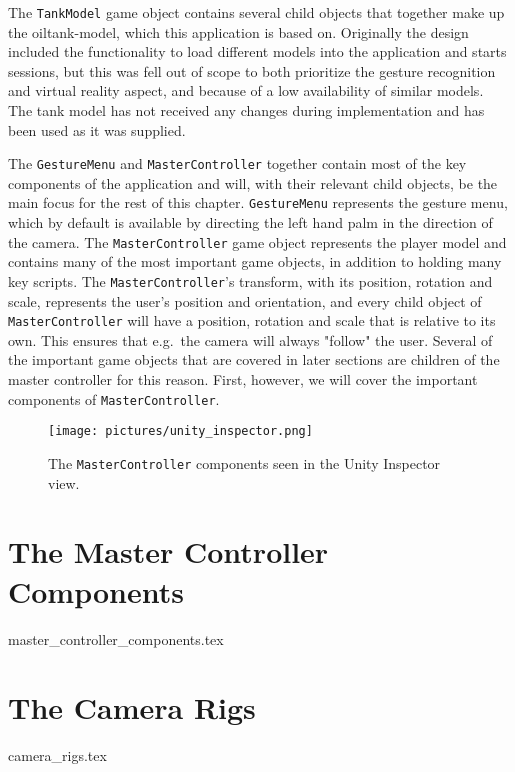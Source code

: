 The \texttt{TankModel} game object contains several child objects that together make up the oiltank-model, which this application is based on.
Originally the design included the functionality to load different models into the application and starts sessions, but 
this was fell out of scope to both prioritize the gesture recognition and virtual reality aspect, and because of a low availability of similar models.
The tank model has not received any changes during implementation and has been used as it was supplied. 

The \texttt{GestureMenu} and \texttt{MasterController} together contain most of the key components of the application and will, with their relevant child objects,
be the main focus for the rest of this chapter. \texttt{GestureMenu} represents the gesture menu, which by default is available by directing the left hand palm in the 
direction of the camera. The \texttt{MasterController} game object represents the player model and contains many of the most important game objects, in addition to
holding many key scripts. The \texttt{MasterController}'s transform, with its position, rotation and scale, represents the user's position and orientation, 
and every child object of \texttt{MasterController} will have a position, rotation and scale that is relative to its own. This ensures
that e.g.~the camera will always "follow" the user. Several of the important game objects that are covered in later sections are children of 
the master controller for this reason. First, however, we will cover the important components of \texttt{MasterController}.

\begin{figure}%
	\texttt{[image: pictures/unity\_inspector.png]} %
	\caption[The \texttt{MasterController} components]{The \texttt{MasterController} components seen in the Unity Inspector view.}
	\label{fig:unity_inspector}
\end{figure} 

\section{The Master Controller Components}
{master_controller_components.tex}


\section{The Camera Rigs}
\label{sec:camera_rigs}
{camera_rigs.tex}


